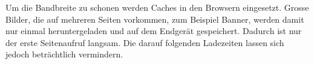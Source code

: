Um die Bandbreite zu schonen werden Caches in den Browsern eingesetzt. Grosse Bilder, die auf mehreren Seiten vorkommen, zum Beispiel Banner, werden damit nur einmal heruntergeladen und auf dem Endgerät gespeichert. Dadurch ist nur der erste Seitenaufruf langsam. Die darauf folgenden Ladezeiten lassen sich jedoch beträchtlich vermindern.